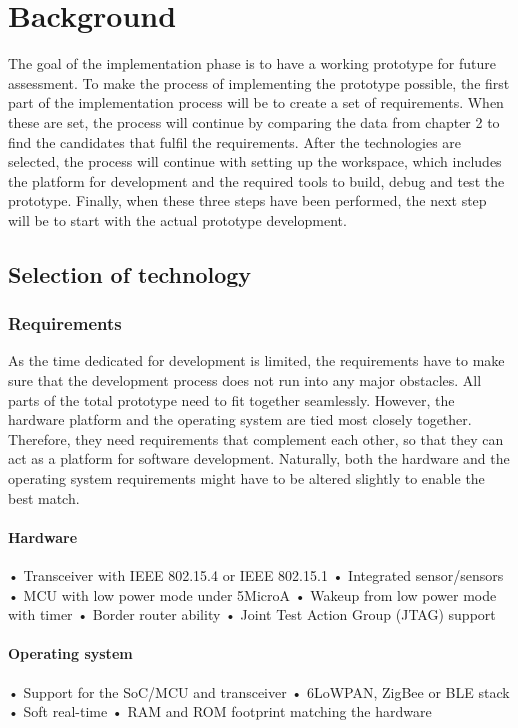 \section{Background}

The goal of the implementation phase is to have a working prototype for future assessment.
To make the process of implementing the prototype possible,
	the first part of the implementation process will be to create a set of requirements.
When these are set,
	the process will continue by comparing the data from chapter 2 to find the candidates that fulfil the requirements.
After the technologies are selected,
	the process will continue with setting up the workspace,
	which includes the platform for development and the required tools to build,
	debug and test the prototype.
Finally,
	when these three steps have been performed,
	the next step will be to start with the actual prototype development.
	
\subsection{Selection of technology}

\subsubsection{Requirements}
As the time dedicated for development is limited,
	the requirements have to make sure that the development process does not run into any major obstacles.
All parts of the total prototype need to fit together seamlessly.
However,
	the hardware platform and the operating system are tied most closely together.
Therefore,
	they need requirements that complement each other,
	so that they can act as a platform for software development.
Naturally,
	both the hardware and the operating system requirements might have to be altered slightly to enable the best match.
	
\paragraph{Hardware}
• Transceiver with IEEE 802.15.4 or IEEE 802.15.1
• Integrated sensor/sensors
• MCU with low power mode under 5MicroA
• Wakeup from low power mode with timer
• Border router ability
• Joint Test Action Group (JTAG) support

\paragraph{Operating system}
• Support for the SoC/MCU and transceiver
• 6LoWPAN, ZigBee or BLE stack
• Soft real-time
• RAM and ROM footprint matching the hardware

